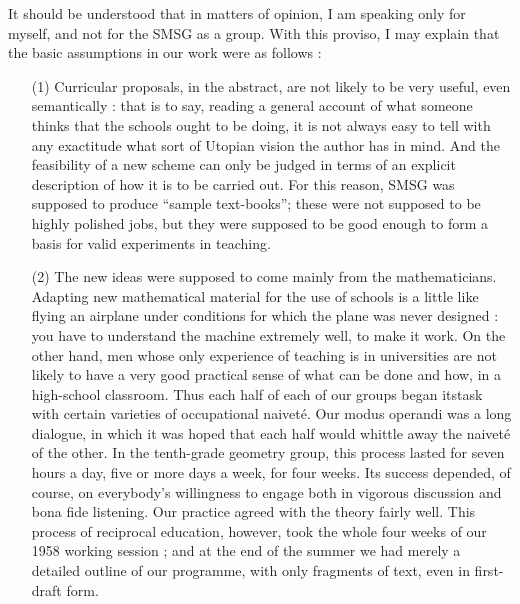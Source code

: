 It should be understood that in matters of opinion, I am speaking only
for myself, and not for the SMSG as a group. With this proviso, I may
explain that the basic assumptions in our work were as follows :
\begin{itemize}
\item[(1)] Curricular proposals, in the abstract, are not likely to be
  very useful, even semantically : that is to say, reading a general
  account of what someone thinks that the schools ought to be doing,
  it is not always easy to tell with any exactitude what sort of
  Utopian vision the author has in mind. And the feasibility of a new
  scheme can only be judged in terms of an explicit description of how
  it is to be carried out. For this reason, SMSG was supposed to
  produce ``sample text-books''; these were not supposed to be highly
  polished jobs, but they were supposed to be good enough to form a
  basis for valid experiments in teaching.

\item[(2)] The new ideas were supposed to come mainly from the
  mathematicians. Adapting new mathematical material for the use of
  schools is a little like flying an airplane under conditions for
  which the plane was never designed : you have to understand the
  machine extremely well, to make it work. On the other hand, men
  whose only experience of teaching is in universities are not likely
  to have a very good practical sense of what can be done and how, in
  a high-school classroom. Thus each half of each of our groups began
  its\pageoriginale task with certain varieties of occupational
  naivet\'e. Our modus operandi was a long dialogue, in which it was
  hoped that each half would whittle away the naivet\'e of the
  other. In the tenth-grade geometry group, this process lasted for
  seven hours a day, five or more days a week, for four weeks. Its
  success depended, of course, on everybody's willingness to engage
  both in vigorous discussion and bona fide listening. Our practice
  agreed with the theory fairly well. This process of reciprocal
  education, however, took the whole four weeks of our 1958 working
  session ; and at the end of the summer we had merely a detailed
  outline of our programme, with only fragments of text, even in
  first-draft form.
\end{itemize}

